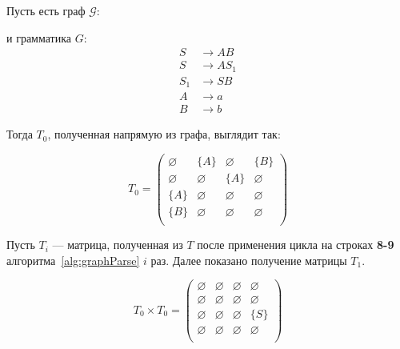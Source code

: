 \begin{example}

Пусть есть граф $\mathcal{G}$:
\begin{center}
    
\end{center}

и грамматика $G$:
\begin{align*}
S   &\to A B \\ 
S  &\to A S_1 \\ 
S_1 &\to S B \\
A  &\to a \\ 
B   &\to b
\end{align*}

Тогда $T_0$, полученная напрямую из графа, выглядит так:


\[
T_0 = \begin{pmatrix}
    \varnothing & \{A\}       & \varnothing & \{B\}       \\
    \varnothing & \varnothing & \{A\}       & \varnothing \\
    \{A\}       & \varnothing & \varnothing & \varnothing \\
    \{B\}       & \varnothing & \varnothing & \varnothing \\
\end{pmatrix}
\]

Пусть $T_i$ --- матрица, полученная из $T$ после применения цикла на строках \textbf{8-9} алгоритма~\ref{alg:graphParse} $i$ раз. Далее показано получение матрицы $T_1$.


\[
T_0 \times T_0 = \begin{pmatrix}
    \varnothing & \varnothing & \varnothing & \varnothing \\
    \varnothing & \varnothing & \varnothing & \varnothing \\
    \varnothing & \varnothing & \varnothing & \{S\}       \\
    \varnothing & \varnothing & \varnothing & \varnothing \\
\end{pmatrix}
\]


\end{example}
